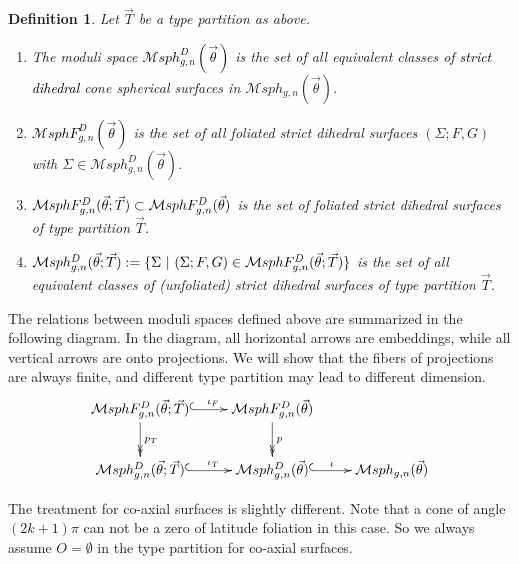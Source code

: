 \documentclass[pdflatex,sn-mathphys]{sn-jnl}%
\numberwithin{equation}{section}
\theoremstyle{thmstyleone}%
\newtheorem{definition}[theorem]{Definition}
\newcommand{\Msphgn}{\mathcal{M}sph_{g,n}(\vec{\theta})}
\newcommand{\MsphgnD}{\mathcal{M}sph^D_{g,n}(\vec{\theta})}
\newcommand{\MsphgnDF}{\mathcal{M}sphF_{g,n}^D(\vec{\theta})}
\newcommand{\MsphgnDT}{\mathcal{M}sph_{g,n}^D(\vec{\theta};\vec{T})}
\newcommand{\MsphgnDFT}{\mathcal{M}sphF_{g,n}^D(\vec{\theta};\vec{T})}
\newcommand{\csphsf}{cone spherical surface}
\newcommand{\SYM}{\textcolor{black}}
\newcommand{\EMP}{\textcolor{black}}
\begin{document}
\begin{definition}\label{def:moduli_D}
    Let $\vec{T}$ be a type partition as above.
    \begin{enumerate}
    \item The moduli space \SYM{$\MsphgnD$} is the set of all equivalent classes of \EMP{strict dihedral} \csphsf s in $\Msphgn$.
    \item \SYM{$\MsphgnDF$} is the set of all foliated strict dihedral surfaces $(\Sigma;F,G)$ with $\Sigma\in\MsphgnD$.
    \item $\SYM{\mathcal{M}sphF_{g,n}^D(\vec{\theta};\vec{T})} \subset \MsphgnDF$ is the set of foliated strict dihedral surfaces of type partition $\vec{T}$.
    \item $\SYM{\mathcal{M}sph_{g,n}^D(\vec{\theta};\vec{T})} :=\{ \Sigma \ \lvert\ (\Sigma;F,G)\in \MsphgnDFT \}$ is the set of all equivalent classes of (unfoliated) strict dihedral surfaces of type partition $\vec{T}$.
\end{enumerate}
\end{definition}

The relations between moduli spaces defined above are summarized in the following diagram. In the diagram, all horizontal arrows are embeddings, while all vertical arrows are onto projections. We will show that the fibers of projections are always finite, and different type partition may lead to different dimension. %
\begin{equation}\label{eq:moduli_spaces_D} \begin{gathered}
    \xymatrix{%
    \MsphgnDFT \ar@{^(->}[r]^{\quad\iota_F} \ar@{->>}[d]^{p_T}    & \MsphgnDF \ar@{->>}[d]^{p}    &\\
    \MsphgnDT \ar@{^(->}[r]^{\quad\iota_T}     & \MsphgnD \ar@{^(->}[r]^{\iota}     & \Msphgn
    }
\end{gathered} \end{equation}

The treatment for co-axial surfaces is slightly different. Note that a cone of angle $(2k+1)\pi$ can not be a zero of latitude foliation in this case. So we always assume $O=\emptyset$ in the type partition for co-axial surfaces.
\end{document}
